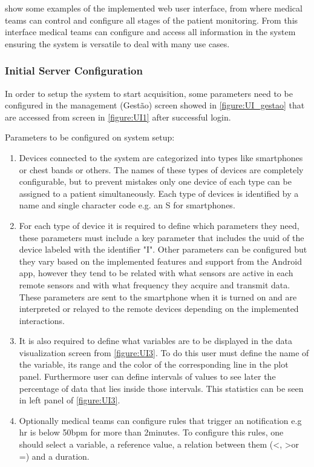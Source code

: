  show some examples of the implemented web user interface, from where medical teams can control and configure all stages of the patient monitoring. From this interface medical teams can configure and access all information in the system ensuring the system is versatile to deal with many use cases.

\FloatBarrier
\subsubsection{Initial Server Configuration}



In order to setup the system to start acquisition, some parameters need to be configured in the management (Gestão) screen showed in \cref{figure:UI_gestao} that are accessed from screen in \cref{figure:UI1} after successful login.

Parameters to be configured on system setup:

\begin{enumerate}
	\item Devices connected to the system are categorized into types like smartphones or chest bands or others. The names of these types of devices are completely configurable, but to prevent mistakes only one device of each type can be assigned to a patient simultaneously. Each type of devices is identified by a name and single character code e.g. an S for smartphones.
	
	\item For each type of device it is required to define which parameters they need, these parameters must include a key parameter that includes the \ac{uuid} of the device labeled with the identifier "I". Other parameters can be configured but they vary based on the implemented features and support from the Android app, however they tend to be related with what sensors are active in each remote sensors and with what frequency they acquire and transmit data. These parameters are sent to the smartphone when it is turned on and are interpreted or relayed to the remote devices depending on the implemented interactions.
	
	\item It is also required to define what variables are to be displayed in the data visualization screen from \cref{figure:UI3}. To do this user must define the name of the variable, its range and the color of the corresponding line in the plot panel. Furthermore user can define intervals of values to see later the percentage of data that lies inside those intervals. This statistics can be seen in left panel of \cref{figure:UI3}.
	
	\item Optionally medical teams can configure rules that trigger an notification e.g \ac{hr} is below 50\ac{bpm} for more than 2minutes. To configure this rules, one should select a variable, a reference value, a relation between them (\textless, \textgreater or =) and a duration.
\end{enumerate}

